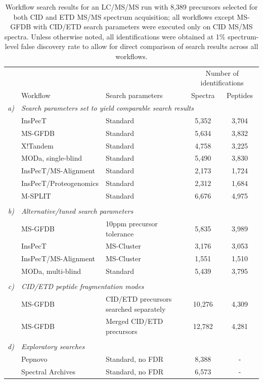 \documentclass[arial,11pt]{article}
\begin{document}


\footnotesize
\begin{table}[htb!]
\centering
\begin{tabular}{rlp{2in}cc}
 & & & \multicolumn{2}{c}{Number of identifications}\\
& Workflow & Search parameters & Spectra & Peptides \\
\hline
\em a) & \multicolumn{4}{l}{\em Search parameters set to yield comparable search results}\\
& InsPecT                & Standard & 5,352 & 3,704 \\
& MS-GFDB                & Standard & 5,634 & 3,832 \\
& X!Tandem               & Standard & 4,758 & 3,225 \\
& MODa, single-blind     & Standard & 5,490 & 3,830 \\
& InsPecT/MS-Alignment   & Standard & 2,173 & 1,724 \\
& InsPecT/Proteogenomics & Standard & 2,312 & 1,684 \\
& M-SPLIT                & Standard & 6,676 & 4,975 \\
\\
\em b) & \multicolumn{4}{l}{\em Alternative/tuned search parameters}\\
& MS-GFDB              & 10ppm precursor tolerance & 5,835 & 3,989 \\
& InsPecT              & MS-Cluster                & 3,176 & 3,053 \\
& InsPecT/MS-Alignment & MS-Cluster                & 1,551 & 1,510 \\
& MODa, multi-blind    & Standard                  & 5,439 & 3,795 \\
\\
\em c) & \multicolumn{4}{l}{\em CID/ETD peptide fragmentation modes}\\
& MS-GFDB & CID/ETD precursors searched separately & 10,276 & 4,309 \\
& MS-GFDB & Merged CID/ETD precursors & 12,782 & 4,281 \\
\\
\em d) & \multicolumn{4}{l}{\em Exploratory searches}\\
& Pepnovo                & Standard, no FDR & 8,388 & \-- \\
& Spectral Archives      & Standard, no FDR & 6,573 & \-- \\
\hline
\end{tabular}\\
\scriptsize
%
\caption{\footnotesize Workflow search results for an LC/MS/MS run with 8,389 precursors selected for both CID and ETD MS/MS spectrum acquisition; all workflows except MS-GFDB with CID/ETD search parameters were executed only on CID MS/MS spectra. Unless otherwise noted, all identifications were obtained at 1\% spectrum-level false discovery rate to allow for direct comparison of search results across all workflows.} \label{tab:searches}
\end{table}
\normalsize
\end{document}
